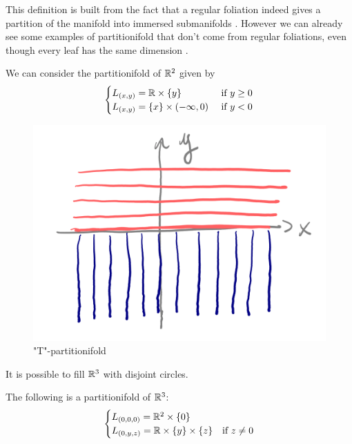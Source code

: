 	This definition is built from the fact that a regular foliation indeed gives a partition of the manifold into immersed submanifolds . However we can already see some examples of partitionifold that don't come from regular foliations, even though every leaf has the same dimension .

	\begin{example}[``T'' partitionifold]
		We can consider the partitionifold of $\mathbb{R}^2$ given by
		$$
		\begin{cases}
			L_{(x,y)} = \mathbb{R} \times \{y\}            &\text{ if } y \geq 0 \\
			L_{(x,y)} = \{x\} \times (-\infty, 0)  &\text{ if } y < 0
		\end{cases}
		$$

		\begin{figure}[H]
		    \centering
		    \includegraphics[width=0.8\linewidth]{T-foliation.png}
		    \caption{"T"-partitionifold}
		    \label{fig:enter-label}
		\end{figure}
	\end{example}

	\begin{example}
		It is possible to fill $\mathbb{R}^3$ with disjoint circles. 
	\end{example}

    \begin{example}
        The following is a partitionifold of $\mathbb{R}^3$:
%
        \begin{align*}
            \begin{cases}
                L_{(0, 0, 0)} = \mathbb{R}^2 \times \{0\} \\
                L_{(0, y, z)} = \mathbb{R} \times \{y\} \times\{z\} &\text{if $z \neq 0$} 
            \end{cases}
        \end{align*}
    \end{example}

